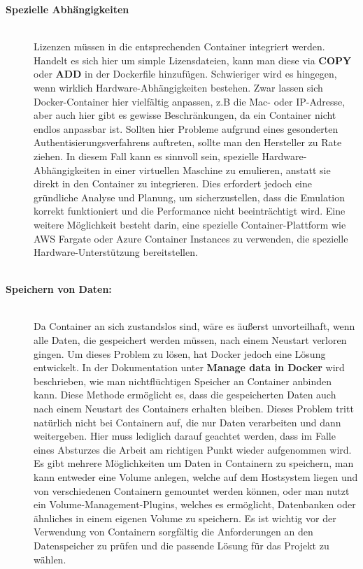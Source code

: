 \begin{description}
	\item[\textbf{Spezielle Abhängigkeiten}]\hfill \\ Lizenzen müssen in die entsprechenden Container integriert werden. Handelt es sich hier um simple Lizensdateien, kann man diese via \textbf{COPY} oder \textbf{ADD} in der Dockerfile hinzufügen. Schwieriger wird es hingegen, wenn wirklich Hardware-Abhängigkeiten bestehen. Zwar lassen sich Docker-Container hier vielfältig anpassen, z.B die Mac- oder IP-Adresse, aber auch hier gibt es gewisse Beschränkungen, da ein Container nicht endlos anpassbar ist. Sollten hier Probleme aufgrund eines gesonderten Authentisierungsverfahrens auftreten, sollte man den Hersteller zu Rate ziehen. In diesem Fall kann es sinnvoll sein, spezielle Hardware-Abhängigkeiten in einer virtuellen Maschine zu emulieren, anstatt sie direkt in den Container zu integrieren. Dies erfordert jedoch eine gründliche Analyse und Planung, um sicherzustellen, dass die Emulation korrekt funktioniert und die Performance nicht beeinträchtigt wird. Eine weitere Möglichkeit besteht darin, eine spezielle Container-Plattform wie AWS Fargate oder Azure Container Instances zu verwenden, die spezielle Hardware-Unterstützung bereitstellen. \\ \\
	\item[\textbf{Speichern von Daten:}]\hfill \\ Da Container an sich zustandslos sind, wäre es äußerst unvorteilhaft, wenn alle Daten, die gespeichert werden müssen, nach einem Neustart verloren gingen. Um dieses Problem zu lösen, hat Docker jedoch eine Lösung entwickelt. In der Dokumentation unter \textbf{Manage data in Docker} \cite{dockerrstorage} wird beschrieben, wie man nichtflüchtigen Speicher an Container anbinden kann. Diese Methode ermöglicht es, dass die gespeicherten Daten auch nach einem Neustart des Containers erhalten bleiben. Dieses Problem tritt natürlich nicht bei Containern auf, die nur Daten verarbeiten und dann weitergeben. Hier muss lediglich darauf geachtet werden, dass im Falle eines Absturzes die Arbeit am richtigen Punkt wieder aufgenommen wird. Es gibt mehrere Möglichkeiten um Daten in Containern zu speichern, man kann entweder eine Volume anlegen, welche auf dem Hostsystem liegen und von verschiedenen Containern gemountet werden können, oder man nutzt ein Volume-Management-Plugins, welches es ermöglicht, Datenbanken oder ähnliches in einem eigenen Volume zu speichern. Es ist wichtig vor der Verwendung von Containern sorgfältig die Anforderungen an den Datenspeicher zu prüfen und die passende Lösung für das Projekt zu wählen.\\ \\
\end{description}


